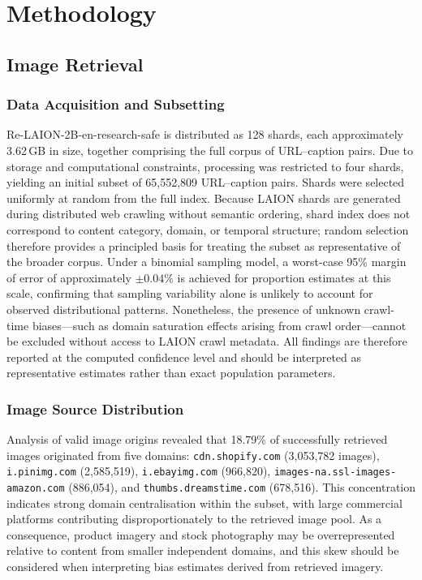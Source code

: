 \graphicspath{{content/chapters/3_methodology/figures/}}

\chapter{Methodology}
\label{chp:methodology}

\section{Image Retrieval}

\subsection{Data Acquisition and Subsetting}

Re-LAION-2B-en-research-safe is distributed as 128 shards, each approximately 3.62\,GB in
size, together comprising the full corpus of URL--caption pairs. Due to
storage and computational constraints, processing was restricted to four
shards, yielding an initial subset of 65,552,809 URL--caption pairs. Shards
were selected uniformly at random from the full index. Because LAION shards
are generated during distributed web crawling without semantic ordering,
shard index does not correspond to content category, domain, or temporal
structure; random selection therefore provides a principled basis for
treating the subset as representative of the broader corpus. Under a
binomial sampling model, a worst-case 95\% margin of error of approximately
$\pm 0.04\%$ is achieved for proportion estimates at this scale, confirming
that sampling variability alone is unlikely to account for observed
distributional patterns. Nonetheless, the presence of unknown crawl-time
biases---such as domain saturation effects arising from crawl order---cannot
be excluded without access to LAION crawl metadata. All findings are
therefore reported at the computed confidence level and should be
interpreted as representative estimates rather than exact population
parameters.

\subsection{Image Source Distribution}

Analysis of valid image origins revealed that 18.79\% of successfully
retrieved images originated from five domains: \texttt{cdn.shopify.com}
(3,053,782 images), \texttt{i.pinimg.com} (2,585,519),
\texttt{i.ebayimg.com} (966,820),
\texttt{images-na.ssl-images-amazon.com} (886,054), and
\texttt{thumbs.dreamstime.com} (678,516). This concentration indicates
strong domain centralisation within the subset, with large commercial
platforms contributing disproportionately to the retrieved image pool. As a
consequence, product imagery and stock photography may be overrepresented
relative to content from smaller independent domains, and this skew should
be considered when interpreting bias estimates derived from retrieved
imagery.

